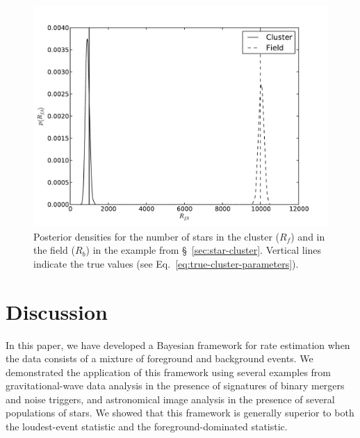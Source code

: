 \documentclass[aps,prd,reprint,nofootinbib]{revtex4-1}
\begin{document}
\begin{figure}
  \includegraphics[width=\columnwidth]{numbers}
  \caption{\label{fig:cluster-number} Posterior densities for the
    number of stars in the cluster ($R_f$) and in the field ($R_b$) in
    the example from \S~\ref{sec:star-cluster}.  Vertical lines
    indicate the true values (see
    Eq.~\eqref{eq:true-cluster-parameters}). }
\end{figure}

\section{Discussion}\label{sec:discussion}

In this paper, we have developed a Bayesian framework for rate
estimation when the data consists of a mixture of foreground and
background events.  We demonstrated the application of this framework
using several examples from gravitational-wave data analysis in the
presence of signatures of binary mergers and noise triggers, and
astronomical image analysis in the presence of several populations of
stars.  We showed that this framework is generally superior to both
the loudest-event statistic and the foreground-dominated
statistic.
\end{document}
